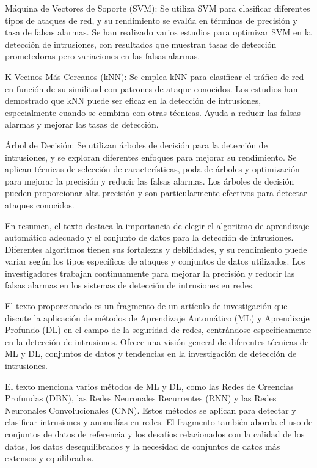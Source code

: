 \documentclass[11pt, a4paper]{article} %
\begin{document}
Máquina de Vectores de Soporte (SVM): Se utiliza SVM para clasificar diferentes tipos de ataques de red, y su rendimiento se evalúa en términos de precisión y tasa de falsas alarmas. Se han realizado varios estudios para optimizar SVM en la detección de intrusiones, con resultados que muestran tasas de detección prometedoras pero variaciones en las falsas alarmas.

K-Vecinos Más Cercanos (kNN): Se emplea kNN para clasificar el tráfico de red en función de su similitud con patrones de ataque conocidos. Los estudios han demostrado que kNN puede ser eficaz en la detección de intrusiones, especialmente cuando se combina con otras técnicas. Ayuda a reducir las falsas alarmas y mejorar las tasas de detección.

Árbol de Decisión: Se utilizan árboles de decisión para la detección de intrusiones, y se exploran diferentes enfoques para mejorar su rendimiento. Se aplican técnicas de selección de características, poda de árboles y optimización para mejorar la precisión y reducir las falsas alarmas. Los árboles de decisión pueden proporcionar alta precisión y son particularmente efectivos para detectar ataques conocidos.

En resumen, el texto destaca la importancia de elegir el algoritmo de aprendizaje automático adecuado y el conjunto de datos para la detección de intrusiones. Diferentes algoritmos tienen sus fortalezas y debilidades, y su rendimiento puede variar según los tipos específicos de ataques y conjuntos de datos utilizados. Los investigadores trabajan continuamente para mejorar la precisión y reducir las falsas alarmas en los sistemas de detección de intrusiones en redes.


 El texto proporcionado es un fragmento de un artículo de investigación que discute la aplicación de métodos de Aprendizaje Automático (ML) y Aprendizaje Profundo (DL) en el campo de la seguridad de redes, centrándose específicamente en la detección de intrusiones. Ofrece una visión general de diferentes técnicas de ML y DL, conjuntos de datos y tendencias en la investigación de detección de intrusiones.

El texto menciona varios métodos de ML y DL, como las Redes de Creencias Profundas (DBN), las Redes Neuronales Recurrentes (RNN) y las Redes Neuronales Convolucionales (CNN). Estos métodos se aplican para detectar y clasificar intrusiones y anomalías en redes. El fragmento también aborda el uso de conjuntos de datos de referencia y los desafíos relacionados con la calidad de los datos, los datos desequilibrados y la necesidad de conjuntos de datos más extensos y equilibrados.
\end{document}
